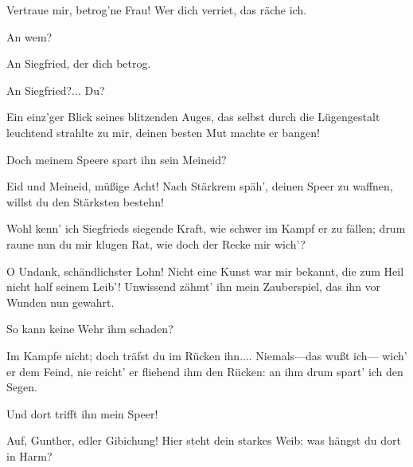 \begin{drama}
\Hagenspeaks



Vertraue mir, betrog'ne Frau!
Wer dich verriet, das räche ich.
 

\Brunnhildespeaks



An wem?
 

\Hagenspeaks

An Siegfried, der dich betrog.
 

\Brunnhildespeaks

An Siegfried?... Du?


Ein einz'ger Blick seines blitzenden Auges,
das selbst durch die Lügengestalt
leuchtend strahlte zu mir,
deinen besten Mut
machte er bangen!
 

\Hagenspeaks

Doch meinem Speere
spart ihn sein Meineid?
 

\Brunnhildespeaks

Eid und Meineid, müßige Acht!
Nach Stärkrem späh',
deinen Speer zu waffnen,
willst du den Stärksten bestehn!
 

\Hagenspeaks

Wohl kenn' ich Siegfrieds siegende Kraft,
wie schwer im Kampf er zu fällen;
drum raune nun du mir klugen Rat,
wie doch der Recke mir wich'?
 

\Brunnhildespeaks

O Undank, schändlichster Lohn!
Nicht eine Kunst war mir bekannt,
die zum Heil nicht half seinem Leib'!
Unwissend zähmt' ihn mein Zauberspiel,
das ihn vor Wunden nun gewahrt.
 

\Hagenspeaks

So kann keine Wehr ihm schaden?
 

\Brunnhildespeaks

Im Kampfe nicht; doch
träfst du im Rücken ihn....
Niemals---das wußt ich---
wich' er dem Feind,
nie reicht' er fliehend ihm den Rücken:
an ihm drum spart' ich den Segen.
 

\Hagenspeaks

Und dort trifft ihn mein Speer!


Auf, Gunther, edler Gibichung!
Hier steht dein starkes Weib:
was hängst du dort in Harm?
 

\Guntherspeaks




\end{drama}
